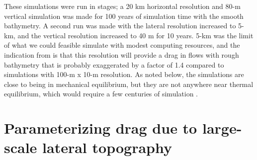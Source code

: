\documentclass[twocol]{ametsocV5}
\newcommand{\tempS}[1]{}
\newcommand{\twowidth}[0]{4in}
\providecommand{\DIFadd}[1]{{\protect\color{blue}\uwave{#1}}} %
\providecommand{\DIFaddbegin}{} %
\providecommand{\DIFaddend}{} %
\begin{document}
These simulations were run in stages; a 20 km horizontal resolution and 80-m vertical simulation was made for 100 years of simulation time with the smooth bathymetry.  A second run was made \DIFaddbegin \DIFadd{(*carried out/conducted?*) }\DIFaddend with the lateral resolution increased to 5-km, and the vertical resolution increased to 40 m for 10 years. 5-km was the limit of what we could feasible simulate with modest computing resources, and the indication from \citet{klymak18} is that this resolution will provide a drag in flows with rough bathymetry that is probably exaggerated by a factor of 1.4 compared to simulations with  100-m x 10-m resolution.     
As noted below, the simulations are close to being in mechanical equilibrium, but they are not anywhere near thermal equilibrium, which would require a few centuries of simulation \citep[i.e.][run similar simulations for 620 years]{Munday_2015}.   

\section{Parameterizing drag due to large-scale lateral topography}
\label{sec:ResultsSingleFlow}


\end{document}
